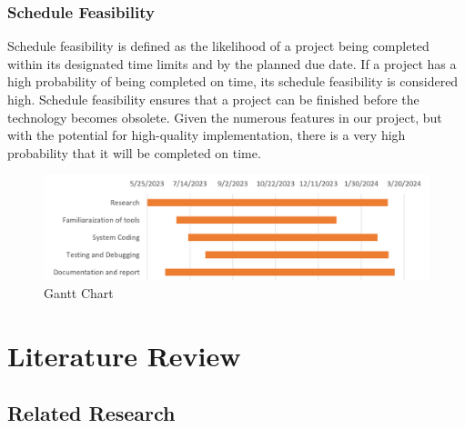 \subsection{Schedule Feasibility}
Schedule feasibility is defined as the likelihood of a project being completed within its designated time limits and by the planned due date. If a project has a high probability of being completed on time, its schedule feasibility is considered high. Schedule feasibility ensures that a project can be finished before the technology becomes obsolete. Given the numerous features in our project, but with the potential for high-quality implementation, there is a very high probability that it will be completed on time.
\begin{figure}[h!]
    \centering
    \includegraphics[scale=0.8]{images/Ganttchart.png}
    \caption{Gantt Chart}
    \label{fig:my_label}
\end{figure}



\chapter{Literature Review}
\section{Related Research}

